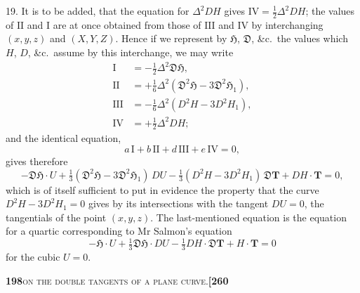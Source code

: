 \documentclass[11pt]{article}
\begin{document}
19. It is to be added, that the equation for $\Delta^2 DH$ gives $\mathrm{IV} = \tfrac{1}{2}\Delta^2 DH$; the values of $\mathrm{II}$ and $\mathrm{I}$ are at once obtained from those of $\mathrm{III}$ and $\mathrm{IV}$ by interchanging $(x, y, z)$ and $(X, Y, Z)$. Hence if we represent by $\mathfrak{H}$, $\mathfrak{D}$, \&c.\ the values which $H$, $D$, \&c.\ assume by this interchange, we may write
\[
\begin{aligned}
\mathrm{I} &= -\tfrac{1}{2}\Delta^2\mathfrak{D}\mathfrak{H},\\
\mathrm{II} &= +\tfrac{1}{6}\Delta^2(\mathfrak{D}^2\mathfrak{H} - 3\mathfrak{D}^2\mathfrak{H}_1),\\
\mathrm{III} &= -\tfrac{1}{6}\Delta^2(D^2H - 3D^2H_1),\\
\mathrm{IV} &= +\tfrac{1}{2}\Delta^2 DH;
\end{aligned}
\]
and the identical equation,
\[
a\,\mathrm{I} + b\,\mathrm{II} + d\,\mathrm{III} + e\,\mathrm{IV} = 0,
\]
gives therefore
\[
-\mathfrak{D}\mathfrak{H} \cdot U + \tfrac{1}{3}(\mathfrak{D}^2\mathfrak{H} - 3\mathfrak{D}^2\mathfrak{H}_1)\,DU - \tfrac{1}{3}(D^2H - 3D^2H_1)\,\mathfrak{D}\mathbf{T} + DH \cdot \mathbf{T} = 0,
\]
which is of itself sufficient to put in evidence the property that the curve $D^2H - 3D^2H_1 = 0$ gives by its intersections with the tangent $DU = 0$, the tangentials of the point $(x, y, z)$. The last-mentioned equation is the equation for a quartic corresponding to Mr Salmon's equation
\[
-\mathfrak{H} \cdot U + \tfrac{1}{3}\mathfrak{D}\mathfrak{H} \cdot DU - \tfrac{1}{3}DH \cdot \mathfrak{D}\mathbf{T} + H \cdot \mathbf{T} = 0
\]
for the cubic $U = 0$.

\newpage

\noindent\textbf{198}\hfill\textsc{on the double tangents of a plane curve.}\hfill\textbf{[260}

\medskip
\end{document}
